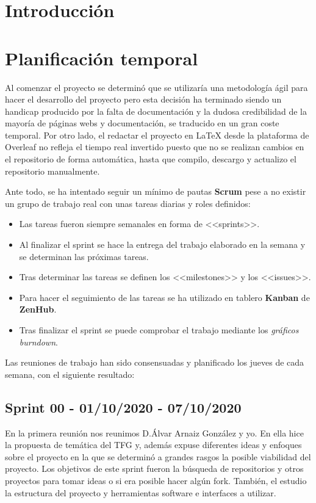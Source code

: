 
\section{Introducción}

\section{Planificación temporal}
Al comenzar el proyecto se determinó que se utilizaría una metodología ágil para hacer el desarrollo del proyecto pero esta decisión ha terminado siendo un handicap producido por la falta de documentación y la dudosa credibilidad de la mayoría de páginas webs y documentación, se traducido en un gran coste temporal.
Por otro lado, el redactar el proyecto en LaTeX desde la plataforma de Overleaf no refleja el tiempo real invertido puesto que no se realizan cambios en el repositorio de forma automática, hasta que compilo, descargo y actualizo el repositorio manualmente.

Ante todo, se ha intentado seguir un mínimo de pautas \textbf{Scrum} pese a no existir un grupo de trabajo real con unas tareas diarias y roles definidos:
\begin{itemize}
    \item Las tareas fueron siempre semanales en forma de <<sprints>>.
    \item Al finalizar el sprint se hace la entrega del trabajo elaborado en la semana y se determinan las próximas tareas.
    \item Tras determinar las tareas se definen los <<milestones>> y los <<issues>>.
    \item Para hacer el seguimiento de las tareas se ha utilizado en tablero \textbf{Kanban} de \textbf{ZenHub}.
    \item Tras finalizar el sprint se puede comprobar el trabajo mediante los  \textit{gráficos burndown}.
\end{itemize}

Las reuniones de trabajo han sido consensuadas y planificado los jueves de cada semana, con el siguiente resultado:

\subsection{Sprint 00 - 01/10/2020 - 07/10/2020}
En la primera reunión nos reunimos D.Álvar Arnaiz González y yo. En ella hice la propuesta de temática del TFG y, además expuse diferentes ideas y enfoques sobre el proyecto en la que se determinó a grandes rasgos la posible viabilidad del proyecto.
Los objetivos de este sprint fueron la búsqueda de repositorios y otros proyectos para tomar ideas o si era posible hacer algún fork. También, el estudio la estructura del proyecto y herramientas software e interfaces a utilizar.

